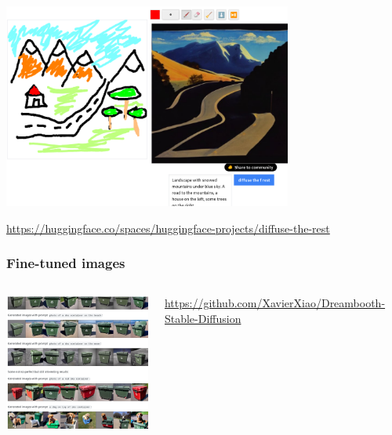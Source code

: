 \documentclass[17pt,aspectratio=169,hyperref={pdfusetitle,colorlinks,allcolors=olive}]{beamer}
\begin{document}
\begin{frame}[fragile]

  \begin{center}
    \includegraphics[width=9.5cm]{figs/sd-mountains}
  \end{center}

  \begin{flushright}
    {\scriptsize
    \url{https://huggingface.co/spaces/huggingface-projects/diffuse-the-rest} \\
    }
  \end{flushright}
    
\end{frame}

\begin{frame}[fragile]
  \frametitle{Fine-tuned images}

  \begin{columns}[T]
    \begin{column}{.48\textwidth}
        \includegraphics[width=6cm]{figs/sd-dreambooth}
    \end{column}%
    \hfill%
    \begin{column}{.48\textwidth}
      \vspace{1.5cm}
      {\scriptsize
        \url{https://github.com/XavierXiao/Dreambooth-Stable-Diffusion} \\
      }
    \end{column}%
  \end{columns}


\end{frame}
\end{document}
